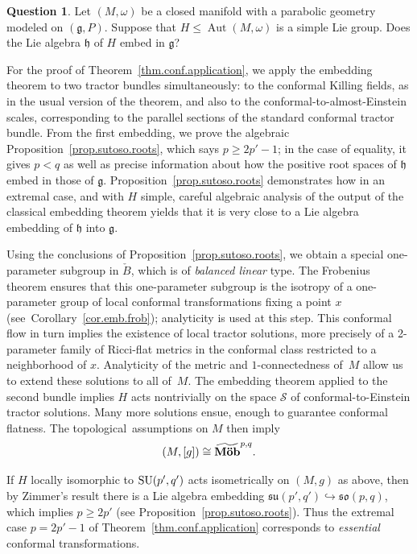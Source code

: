 \documentclass[pdftex]{sigma}
\numberwithin{equation}{section}
\theoremstyle{definition}
\newtheorem{Question}[thm]{Question}
\newcommand{\lieg}{\mathfrak{g}}
\newcommand{\lieh}{\mathfrak{h}}
\newcommand{\so}{\mathfrak{so}}
\newcommand{\Aut}{\operatorname{Aut}}
\newcommand{\SU}{{\rm SU}}
\begin{document}
\begin{Question}\label{quest.simple.embed}
Let $(M,\omega)$ be a closed manifold with a parabolic geometry modeled on $(\lieg, P)$. Suppose that $H \leq \Aut(M, \omega)$ is a simple Lie group. Does the Lie algebra $\lieh$ of $H$ embed in $\lieg$?
\end{Question}

For the proof of Theorem~\ref{thm.conf.application}, we apply the embedding theorem to two tractor bundles simultaneously: to the conformal Killing fields, as in the usual version of the theorem, and also to the conformal-to-almost-Einstein scales, corresponding to the parallel sections of the standard conformal tractor bundle.
From the first embedding, we prove the algebraic Proposition~\ref{prop.sutoso.roots}, which says $p \geq 2 p'-1$; in the case of equality, it gives $p< q$ as well as precise information about how the positive root spaces of $\lieh$ embed in those of $\lieg$. Proposition~\ref{prop.sutoso.roots} demonstrates how in an extremal case, and with $H$ simple, careful algebraic analysis of the output of the classical embedding theorem yields that it is very close to a Lie algebra embedding of $\lieh$ into $\lieg$.

Using the conclusions of Proposition~\ref{prop.sutoso.roots}, we obtain a special one-parameter subgroup in $\check{B}$, which is of \emph{balanced linear} type.
The Frobenius theorem ensures that this one-parameter subgroup is the isotropy of a one-parameter group of local conformal transformations fixing a point $x$ (see~Corollary~\ref{cor.emb.frob}); analyticity is used at this step. This conformal flow in turn implies the existence of local tractor solutions, more precisely of a 2-parameter family of Ricci-flat metrics in the conformal class restricted to a neighborhood of $x$. Analyticity of the metric and $1$-connectedness of~$M$ allow us to extend these solutions to all of~$M$.
The embedding theorem applied to the second bundle implies $H$ acts nontrivially on the space $\mathcal{S}$ of conformal-to-Einstein tractor solutions. Many more solutions ensue, enough to guarantee conformal flatness. The topological~assumptions on $M$ then imply
\[
(M,[g]) \cong \widetilde{\mbox{{\bf M\"ob}}}^{p,q}.
\]

If $H$ locally isomorphic to $\SU(p',q')$ acts isometrically on $(M,g)$ as above, then by Zimmer's result there is a Lie algebra embedding $\mathfrak{su}(p',q') \hookrightarrow \so(p,q)$, which implies $p \geq 2p'$ (see Proposition~\ref{prop.sutoso.roots}). Thus the extremal case $p = 2p'-1$ of Theorem~\ref{thm.conf.application} corresponds to \emph{essential} conformal transformations.
\end{document}
